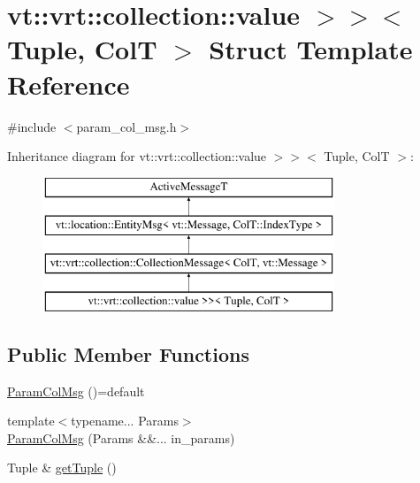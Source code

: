 \hypertarget{structvt_1_1vrt_1_1collection_1_1_param_col_msg_3_01_tuple_00_01_col_t_00_01std_1_1enable__if__tcc6a1858ebbc12bbfd81f56748245add}{}\section{vt\+:\+:vrt\+:\+:collection\+:\+:value $>$$>$$<$ Tuple, ColT $>$ Struct Template Reference}
\label{structvt_1_1vrt_1_1collection_1_1_param_col_msg_3_01_tuple_00_01_col_t_00_01std_1_1enable__if__tcc6a1858ebbc12bbfd81f56748245add}


{\ttfamily \#include $<$param\+\_\+col\+\_\+msg.\+h$>$}

Inheritance diagram for vt\+:\+:vrt\+:\+:collection\+:\+:value $>$$>$$<$ Tuple, ColT $>$\+:\begin{figure}[H]
\begin{center}
\leavevmode
\includegraphics[height=4.000000cm]{structvt_1_1vrt_1_1collection_1_1_param_col_msg_3_01_tuple_00_01_col_t_00_01std_1_1enable__if__tcc6a1858ebbc12bbfd81f56748245add}
\end{center}
\end{figure}
\subsection*{Public Member Functions}
\begin{DoxyCompactItemize}
\item 
\hyperlink{structvt_1_1vrt_1_1collection_1_1_param_col_msg_3_01_tuple_00_01_col_t_00_01std_1_1enable__if__tcc6a1858ebbc12bbfd81f56748245add_a3f158d2bce6804dae653475e383347e8}{Param\+Col\+Msg} ()=default
\item 
{\footnotesize template$<$typename... Params$>$ }\\\hyperlink{structvt_1_1vrt_1_1collection_1_1_param_col_msg_3_01_tuple_00_01_col_t_00_01std_1_1enable__if__tcc6a1858ebbc12bbfd81f56748245add_a15bec91036eea2d5c80bc439befbfbb7}{Param\+Col\+Msg} (Params \&\&... in\+\_\+params)
\item 
Tuple \& \hyperlink{structvt_1_1vrt_1_1collection_1_1_param_col_msg_3_01_tuple_00_01_col_t_00_01std_1_1enable__if__tcc6a1858ebbc12bbfd81f56748245add_a69490b583564e6d54199660264f26905}{get\+Tuple} ()
\end{DoxyCompactItemize}
